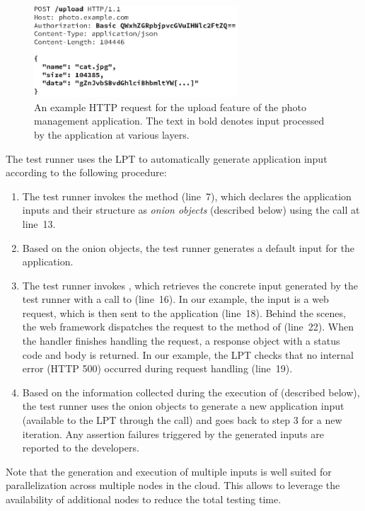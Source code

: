 \begin{figure}
  \centering
  \includegraphics[width=3in]{paas/figures/http-packet}
  \caption{An example HTTP request for the upload feature of the photo
    management application.  The text in bold denotes input processed
    by the application at various layers.}
  \label{fig:http-packet}
\end{figure}

The test runner uses the LPT to automatically generate application
input according to the following procedure:

\begin{enumerate}
\item The test runner invokes the  method (line~7),
  which declares the application inputs and their structure as
  \emph{onion objects} (described below) using the
   call at line~13.
\item Based on the onion objects, the test runner generates a default
  input for the application.
\item The test runner invokes , which retrieves the
  concrete input generated by the test runner with a call to
   (line~16).  In our example, the input is a web
  request, which is then sent to the application (line~18).  Behind
  the scenes, the web framework dispatches the request to the
   method of  (line~22).  When
  the handler finishes handling the request, a response object with a
  status code and body is returned.  In our example, the LPT checks
  that no internal error (HTTP 500) occurred during request handling
  (line~19).
\item Based on the information collected during the execution of
   (described below), the test runner uses the onion
  objects to generate a new application input (available to the LPT
  through the  call) and goes back to step 3 for a
  new iteration.  
%
  Any assertion failures triggered by the generated inputs are
  reported to the developers.
\end{enumerate}
%
Note that the generation and execution of multiple inputs is well
suited for parallelization across multiple nodes in the cloud. This
allows to leverage the availability of additional nodes to reduce the
total testing time.

